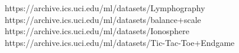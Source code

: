 https://archive.ics.uci.edu/ml/datasets/Lymphography
https://archive.ics.uci.edu/ml/datasets/balance+scale
https://archive.ics.uci.edu/ml/datasets/Ionosphere
https://archive.ics.uci.edu/ml/datasets/Tic-Tac-Toe+Endgame